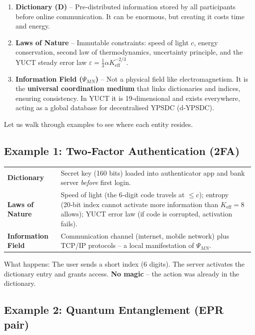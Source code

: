 \documentclass[12pt,a4paper]{article}
\begin{document}
	\begin{enumerate}
		\item \textbf{Dictionary (D)} -- Pre‑distributed information stored by all participants before online communication. It can be enormous, but creating it costs time and energy.
		\item \textbf{Laws of Nature} -- Immutable constraints: speed of light \(c\), energy conservation, second law of thermodynamics, uncertainty principle, and the YUCT steady error law \(\varepsilon = \frac13 \alpha K_{\mathrm{eff}}^{-2/3}\).
		\item \textbf{Information Field (\(\Psi_{MN}\))} -- Not a physical field like electromagnetism. It is the \textbf{universal coordination medium} that links dictionaries and indices, ensuring consistency. In YUCT it is 19‑dimensional and exists everywhere, acting as a global database for decentralised YPSDC (d‑YPSDC).
	\end{enumerate}
	
	Let us walk through examples to see where each entity resides.
	
	\subsection{Example 1: Two‑Factor Authentication (2FA)}
	
	\begin{tabular}{p{2.8cm} p{10cm}}
		\textbf{Dictionary} & Secret key (160 bits) loaded into authenticator app and bank server \emph{before} first login. \\
		\textbf{Laws of Nature} & Speed of light (the 6‑digit code travels at \(\le c\)); entropy (20‑bit index cannot activate more information than \(K_{\mathrm{eff}}=8\) allows); YUCT error law (if code is corrupted, activation fails). \\
		\textbf{Information Field} & Communication channel (internet, mobile network) plus TCP/IP protocols -- a local manifestation of \(\Psi_{MN}\). \\
	\end{tabular}
	
	\noindent What happens: The user sends a short index (6 digits). The server activates the dictionary entry and grants access. \textbf{No magic} -- the action was already in the dictionary.
	
	\subsection{Example 2: Quantum Entanglement (EPR pair)}
	
\end{document}

